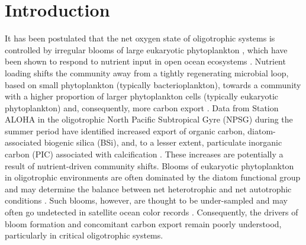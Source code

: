 \section{Introduction}
It has been postulated that the net oxygen state of oligotrophic systems is controlled by irregular blooms of large eukaryotic phytoplankton \citep{Karl2003}, which have been shown to respond to nutrient input in open ocean ecosystems \citep{McAndrew2007}. Nutrient loading shifts the community away from a tightly regenerating microbial loop, based on small phytoplankton (typically bacterioplankton), towards a community with a higher proportion of larger phytoplankton cells (typically eukaryotic phytoplankton) and, consequently, more carbon export \citep{McAndrew2007}. Data from Station ALOHA in the oligotrophic North Pacific Subtropical Gyre (NPSG) during the summer period have identified increased export of organic carbon, diatom-associated biogenic silica (BSi), and, to a lesser extent, particulate inorganic carbon (PIC) associated with calcification \citep{Karl2012}. These increases are potentially a result of nutrient-driven community shifts. Blooms of eukaryotic phytoplankton in oligotrophic environments are often dominated by the diatom functional group \citep{Villareal2012} and may determine the balance between net heterotrophic and net autotrophic conditions \citep{Karl2003}. Such blooms, however, are thought to be under-sampled and may often go undetected in satellite ocean color records \citep{Villareal2011}. Consequently, the drivers of bloom formation and concomitant carbon export remain poorly understood, particularly in critical oligotrophic systems. \par 

